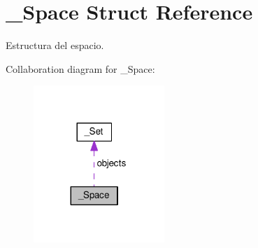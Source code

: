 \hypertarget{struct__Space}{\section{\+\_\+\+Space Struct Reference}
\label{struct__Space}
}


Estructura del espacio.  




Collaboration diagram for \+\_\+\+Space\+:
\nopagebreak
\begin{figure}[H]
\begin{center}
\leavevmode
\includegraphics[width=140pt]{struct__Space__coll__graph}
\end{center}
\end{figure}
